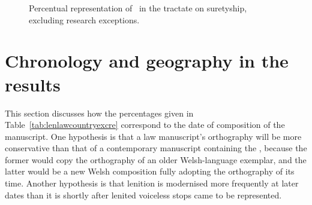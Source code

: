   \begin{figure}[h]
    \centering
    \caption{Percentual representation of \lT\ in the tractate on suretyship, excluding research exceptions.}
    \label{fig:barchartlaws}
  \end{figure}

\section{Chronology and geography in the results}
\label{sec:chronology-laws}

This section discusses how the percentages given in Table~\ref{tab:lenlawcountryexcre} correspond to the date of composition of the manuscript. One hypothesis is that a law manuscript's orthography will be more conservative than that of a contemporary manuscript containing the , because the former would  copy the orthography of an older Welsh-language exemplar, and the latter would be a new Welsh composition fully adopting the orthography of its time. Another hypothesis is that lenition is modernised more frequently at later dates than it is shortly after lenited voiceless stops came to be represented.

